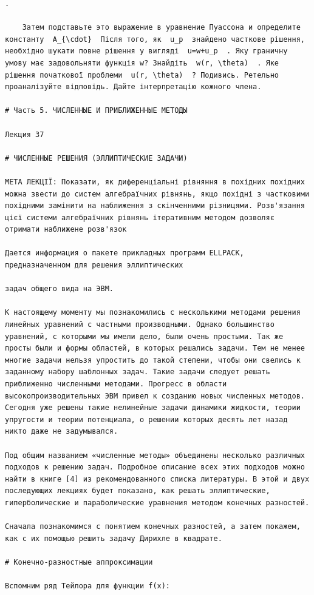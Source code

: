 \documentclass[
  ukrainian,
]{article}
\begin{document}
\begin{verbatim}
.

    Затем подставьте это выражение в уравнение Пуассона и определите константу  A_{\cdot}  Після того, як  u_p  знайдено часткове рішення, необхідно шукати повне рішення у вигляді  u=w+u_p  . Яку граничну умову має задовольняти функція w? Знайдіть  w(r, \theta)  . Яке рішення початкової проблеми  u(r, \theta)  ? Подивись. Ретельно проаналізуйте відповідь. Дайте інтерпретацію кожного члена.

# Часть 5. ЧИСЛЕННЫЕ И ПРИБЛИЖЕННЫЕ МЕТОДЫ

Лекция 37

# ЧИСЛЕННЫЕ РЕШЕНИЯ (ЭЛЛИПТИЧЕСКИЕ ЗАДАЧИ)

МЕТА ЛЕКЦІЇ: Показати, як диференціальні рівняння в похідних похідних можна звести до систем алгебраїчних рівнянь, якщо похідні з частковими похідними замінити на наближення з скінченними різницями. Розв'язання цієї системи алгебраїчних рівнянь ітеративним методом дозволяє отримати наближене розв'язок

Дается информация о пакете прикладных программ ELLPACK, предназначенном для решения эллиптических

задач общего вида на ЭВМ.

К настоящему моменту мы познакомились с несколькими методами решения линейных уравнений с частными производными. Однако большинство уравнений, с которыми мы имели дело, были очень простыми. Так же просты были и формы областей, в которых решались задачи. Тем не менее многие задачи нельзя упростить до такой степени, чтобы они свелись к заданному набору шаблонных задач. Такие задачи следует решать приближенно численными методами. Прогресс в области высокопроизводительных ЭВМ привел к созданию новых численных методов. Сегодня уже решены такие нелинейные задачи динамики жидкости, теории упругости и теории потенциала, о решении которых десять лет назад никто даже не задумывался.

Под общим названием «численные методы» объединены несколько различных подходов к решению задач. Подробное описание всех этих подходов можно найти в книге [4] из рекомендованного списка литературы. В этой и двух последующих лекциях будет показано, как решать эллиптические, гиперболические и параболические уравнения методом конечных разностей.

Сначала познакомимся с понятием конечных разностей, а затем покажем, как с их помощью решить задачу Дирихле в квадрате.

# Конечно-разностные аппроксимации

Вспомним ряд Тейлора для функции f(x):
\end{verbatim}
\end{document}
